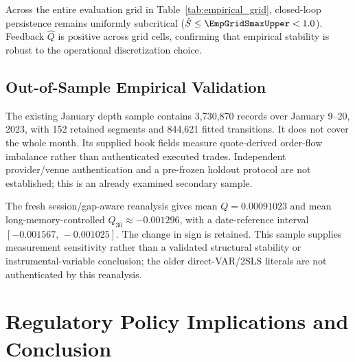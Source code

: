 \documentclass[12pt]{article}
\theoremstyle{definition}
\theoremstyle{remark}
\begin{document}
\begin{table}[htbp]
\centering
\caption{\textbf{Sensitivity of Empirical Feedback Invariants to Sampling Frequency ($\Delta$) and Horizon Window ($W$).}
Estimated persistence $\hat{S}$, feedback parameter $\hat{Q}$, and loop ratio $\hat{\mathcal{L}}$ across sampling intervals $\Delta \in \{1\text{s}, 10\text{s}, 60\text{s}\}$ and moving average window lengths $W \in \{60\text{s}, 300\text{s}, 900\text{s}\}$. Here $a_{\text{EMA}}$ denotes the mechanical filter anchor, distinct from the empirical return autoregression $\hat{J}_{11}$. 95\% confidence intervals in brackets.}
\label{tab:empirical_grid}
\resizebox{\textwidth}{!}{%
%
}
\end{table}

Across the entire evaluation grid in Table~\ref{tab:empirical_grid}, closed-loop persistence remains uniformly subcritical ($\hat{S} \le \EmpGridSmaxUpper < 1.0$). Feedback $\hat{Q}$ is positive across \EmpGridQallPositive{} grid cells, confirming that empirical stability is robust to the operational discretization choice.
\enlargethispage{3.5\baselineskip}

\subsection{Out-of-Sample Empirical Validation}
The existing January depth sample contains 3,730,870 records over January 9--20, 2023, with 152 retained segments and 844,621 fitted transitions. It does not cover the whole month. Its supplied book fields measure quote-derived order-flow imbalance rather than authenticated executed trades. Independent provider/venue authentication and a pre-frozen holdout protocol are not established; this is an already examined secondary sample.

The fresh session/gap-aware reanalysis gives mean $Q=0.00091023$ and mean long-memory-controlled $Q_{30}\approx-0.001296$, with a date-reference interval $[-0.001567,\,\allowbreak -0.001025]$. The change in sign is retained. This sample supplies measurement sensitivity rather than a validated structural stability or instrumental-variable conclusion; the older direct-VAR/2SLS literals are not authenticated by this reanalysis.

\section{Regulatory Policy Implications and Conclusion}
\label{sec:policy_conclusion}
\end{document}
